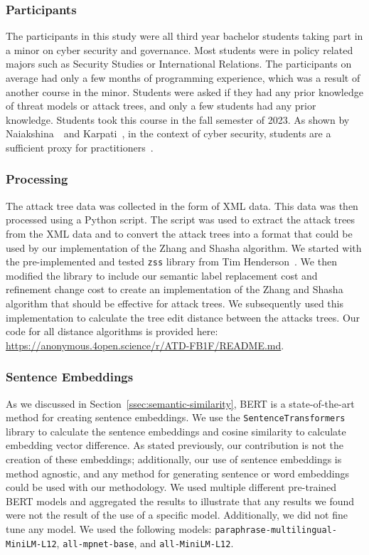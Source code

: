 \subsubsection{Participants}
The participants in this study were all third year bachelor students taking part in a minor on cyber security and governance. Most students were in policy related majors such as Security Studies or International Relations. The participants on average had only a few months of programming experience, which was a result of another course in the minor. Students were asked if they had any prior knowledge of threat models or attack trees, and only a few students had any prior knowledge. Students took this course in the fall semester of 2023. As shown by Naiakshina~\etal\ and Karpati~\etal, in the context of cyber security, students are a sufficient proxy for practitioners~\cite{karpatiComparingAttackTrees2014, naiakshinaConductingSecurityDeveloper2020}.



\subsubsection{Processing}

The attack tree data was collected in the form of XML data. This data was then processed using a Python script. The script was used to extract the attack trees from the XML data and to convert the attack trees into a format that could be used by our implementation of the Zhang and Shasha algorithm. We started with the pre-implemented and tested \texttt{zss} library from Tim Henderson~\cite{hendersonZssTreeEdit}. We then modified the library to include our semantic label replacement cost and refinement change cost to create an implementation of the Zhang and Shasha algorithm that should be effective for attack trees. We subsequently used this implementation to calculate the tree edit distance between the attacks trees. Our code for all distance algorithms is provided here: \url{https://anonymous.4open.science/r/ATD-FB1F/README.md}.


\subsubsection{Sentence Embeddings}
\label{ssec:method-embeddings}

As we discussed in Section~\ref{ssec:semantic-similarity}, BERT is a state-of-the-art method for creating sentence embeddings. We use the \texttt{SentenceTransformers} library to calculate the sentence embeddings and cosine similarity to calculate embedding vector difference. As stated previously, our contribution is not the creation of these embeddings; additionally, our use of sentence embeddings is method agnostic, and any method for generating sentence or word embeddings could be used with our methodology. We used multiple different pre-trained BERT models and aggregated the results to illustrate that any results we found were not the result of the use of a specific model. Additionally, we did not fine tune any model. We used the following models: \texttt{paraphrase-multilingual-MiniLM-L12}, \texttt{all-mpnet-base}, and \texttt{all-MiniLM-L12}.

